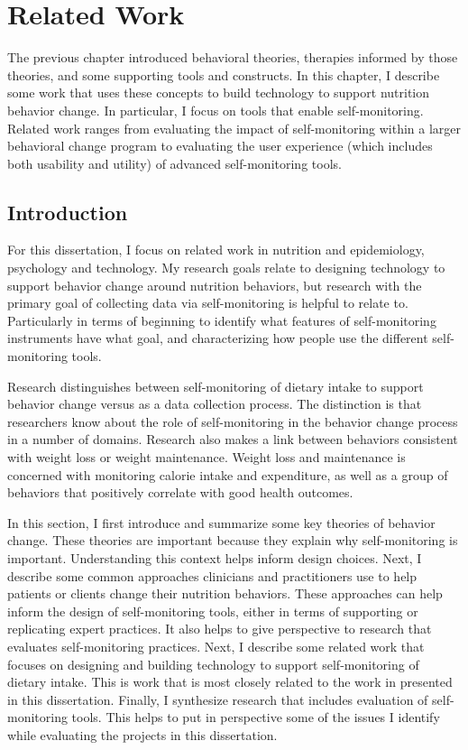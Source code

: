 \chapter{Related Work}
\label{cha:relatedWork}

The previous chapter introduced behavioral theories, therapies informed by those theories, and some supporting tools and constructs. In this chapter, I describe some work that uses these concepts to build technology to support nutrition behavior change. In particular, I focus on tools that enable self-monitoring. Related work ranges from evaluating the impact of self-monitoring within a larger behavioral change program to evaluating the user experience (which includes both usability and utility) of advanced self-monitoring tools. 

\section{Introduction}

For this dissertation, I focus on related work in nutrition and epidemiology, psychology and technology. My research goals relate to designing technology to support behavior change around nutrition behaviors, but research with the primary goal of collecting data via self-monitoring is helpful to relate to. Particularly in terms of beginning to identify what features of self-monitoring instruments have what goal, and characterizing how people use the different self-monitoring tools. 

Research distinguishes between self-monitoring of dietary intake to support behavior change versus as a data collection process. The distinction is that researchers know about the role of self-monitoring in the behavior change process in a number of domains. Research also makes a link between behaviors consistent with weight loss or weight maintenance. Weight loss and maintenance is concerned with monitoring calorie intake and expenditure, as well as a group of behaviors that positively correlate with good health outcomes. 

In this section, I first introduce and summarize some key theories of behavior change. These theories are important because they explain why self-monitoring is important. Understanding this context helps inform design choices. Next, I describe some common approaches clinicians and practitioners use to help patients or clients change their nutrition behaviors. These approaches can help inform the design of self-monitoring tools, either in terms of supporting or replicating expert practices. It also helps to give perspective to research that evaluates self-monitoring practices. Next, I describe some related work that focuses on designing and building technology to support self-monitoring of dietary intake. This is work that is most closely related to the work in presented in this dissertation. Finally, I synthesize research that includes evaluation of self-monitoring tools. This helps to put in perspective some of the issues I identify while evaluating the projects in this dissertation.



